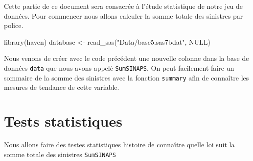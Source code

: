 \documentclass[
]{book}
\newenvironment{Shaded}{\begin{snugshade}}{\end{snugshade}}
\newcommand{\CommentTok}[1]{\textcolor[rgb]{0.56,0.35,0.01}{\textit{#1}}}
\newcommand{\ConstantTok}[1]{\textcolor[rgb]{0.00,0.00,0.00}{#1}}
\newcommand{\DecValTok}[1]{\textcolor[rgb]{0.00,0.00,0.81}{#1}}
\newcommand{\FunctionTok}[1]{\textcolor[rgb]{0.00,0.00,0.00}{#1}}
\newcommand{\NormalTok}[1]{#1}
\newcommand{\OtherTok}[1]{\textcolor[rgb]{0.56,0.35,0.01}{#1}}
\newcommand{\SpecialCharTok}[1]{\textcolor[rgb]{0.00,0.00,0.00}{#1}}
\newcommand{\StringTok}[1]{\textcolor[rgb]{0.31,0.60,0.02}{#1}}
\theoremstyle{definition}
\theoremstyle{definition}
\theoremstyle{definition}
\theoremstyle{definition}
\theoremstyle{remark}
\begin{document}
Cette partie de ce document sera consacrée à l'étude statistique de notre jeu de données.
Pour commencer nous allons calculer la somme totale des sinistres par police.

\begin{Shaded}
\begin{Highlighting}[]
\FunctionTok{library}\NormalTok{(haven)}
\NormalTok{database }\OtherTok{\textless{}{-}} \FunctionTok{read\_sas}\NormalTok{(}\StringTok{"Data/base5.sas7bdat"}\NormalTok{, }
    \ConstantTok{NULL}\NormalTok{)}
\end{Highlighting}
\end{Shaded}

\begin{Shaded}
\end{Shaded}

Nous venons de créer avec le code précédent une nouvelle colonne dans la base de données \texttt{data} que nous avons appelé \texttt{SumSINAPS}.
On peut facilement faire un sommaire de la somme des sinistres avec la fonction \texttt{summary} afin de connaître les mesures de tendance de cette variable.

\begin{Shaded}
\end{Shaded}

\hypertarget{tests-statistiques}{%
\section{Tests statistiques}\label{tests-statistiques}}

Nous allons faire des testes statistiques histoire de connaître quelle loi suit la somme totale des sinistres \texttt{SumSINAPS}
\end{document}
